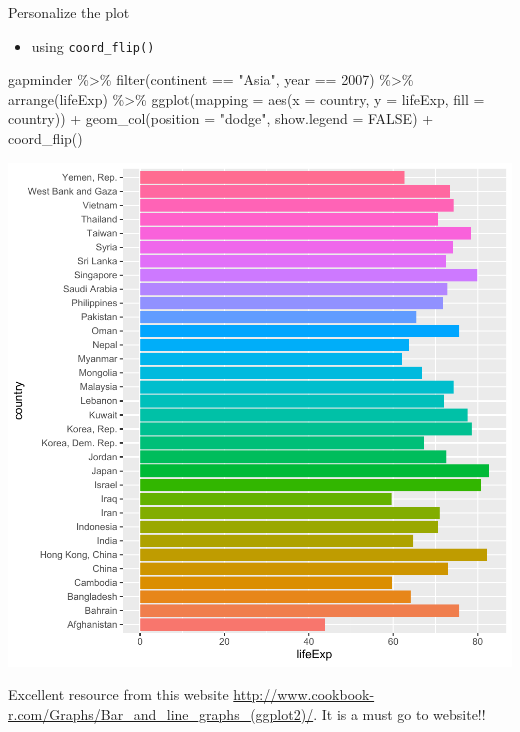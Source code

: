 \documentclass[
]{book}
\makeatletter
\newenvironment{Shaded}{\begin{snugshade}}{\end{snugshade}}
\newcommand{\AttributeTok}[1]{\textcolor[rgb]{0.61,0.61,0.61}{#1}}
\newcommand{\ConstantTok}[1]{\textcolor[rgb]{0,0,0}{#1}}
\newcommand{\DecValTok}[1]{\textcolor[rgb]{0.06,0.06,0.06}{#1}}
\newcommand{\FunctionTok}[1]{\textcolor[rgb]{0,0,0}{#1}}
\newcommand{\NormalTok}[1]{#1}
\newcommand{\SpecialCharTok}[1]{\textcolor[rgb]{0,0,0}{#1}}
\newcommand{\StringTok}[1]{\textcolor[rgb]{0.5,0.5,0.5}{#1}}
\providecommand{\tightlist}{%
  \setlength{\itemsep}{0pt}\setlength{\parskip}{0pt}}
\newenvironment{kframe}{%
\medskip{}
\setlength{\fboxsep}{.8em}
 \def\at@end@of@kframe{}%
 \ifinner\ifhmode%
  \def\at@end@of@kframe{\end{minipage}}%
  \begin{minipage}{\columnwidth}%
 \fi\fi%
 \def\FrameCommand##1{\hskip\@totalleftmargin \hskip-\fboxsep
 \colorbox{shadecolor}{##1}\hskip-\fboxsep
     \hskip-\linewidth \hskip-\@totalleftmargin \hskip\columnwidth}%
 \MakeFramed {\advance\hsize-\width
   \@totalleftmargin\z@ \linewidth\hsize
   \@setminipage}}%
 {\par\unskip\endMakeFramed%
 \at@end@of@kframe}
\renewenvironment{Shaded}{\begin{kframe}}{\end{kframe}}
\makeatother
\begin{document}
Personalize the plot

\begin{itemize}
\tightlist
\item
  using \texttt{coord\_flip()}
\end{itemize}

\begin{Shaded}
\begin{Highlighting}[]
\NormalTok{gapminder }\SpecialCharTok{\%\textgreater{}\%} \FunctionTok{filter}\NormalTok{(continent }\SpecialCharTok{==} \StringTok{"Asia"}\NormalTok{, year }\SpecialCharTok{==} \DecValTok{2007}\NormalTok{) }\SpecialCharTok{\%\textgreater{}\%} \FunctionTok{arrange}\NormalTok{(lifeExp) }\SpecialCharTok{\%\textgreater{}\%}
  \FunctionTok{ggplot}\NormalTok{(}\AttributeTok{mapping =} \FunctionTok{aes}\NormalTok{(}\AttributeTok{x =}\NormalTok{ country, }\AttributeTok{y =}\NormalTok{ lifeExp, }\AttributeTok{fill =}\NormalTok{ country)) }\SpecialCharTok{+}
  \FunctionTok{geom\_col}\NormalTok{(}\AttributeTok{position =} \StringTok{"dodge"}\NormalTok{, }\AttributeTok{show.legend =} \ConstantTok{FALSE}\NormalTok{) }\SpecialCharTok{+} 
  \FunctionTok{coord\_flip}\NormalTok{()}
\end{Highlighting}
\end{Shaded}

\begin{center}\includegraphics[width=0.7\linewidth,keepaspectratio]{Multivariable_Data_Analysis_files/figure-latex/unnamed-chunk-72-1} \end{center}

Excellent resource from this website \url{http://www.cookbook-r.com/Graphs/Bar_and_line_graphs_(ggplot2)/}. It is a must go to website!!
\end{document}

